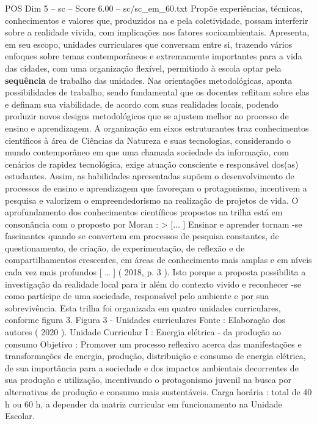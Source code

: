 \begin{textsample}{POS Dim 5 – sc – Score 6.00 – sc/sc\_em\_60.txt}
Propõe experiências, técnicas, conhecimentos e valores que, produzidos na e pela coletividade, possam interferir sobre a realidade vivida, com implicações nos fatores socioambientais.
Apresenta, em seu escopo, unidades curriculares que conversam entre si, trazendo vários enfoques sobre temas contemporâneos e extremamente importantes para a vida das cidades, com uma organização flexível, permitindo à escola optar pela \textbf{sequência} de trabalho das unidades.
Nas orientações metodológicas, aponta possibilidades de trabalho, sendo fundamental que os docentes reflitam sobre elas e definam sua viabilidade, de acordo com suas realidades locais, podendo produzir novos designs metodológicos que se ajustem melhor ao processo de ensino e aprendizagem.
A organização em eixos estruturantes traz conhecimentos científicos à área de Ciências da Natureza e suas tecnologias, considerando o mundo contemporâneo em que uma chamada sociedade da informação, com cenários de rapidez tecnológica, exige atuação consciente e responsável dos(as) estudantes.
Assim, as habilidades apresentadas supõem o desenvolvimento de processos de ensino e aprendizagem que favoreçam o protagonismo, incentivem a pesquisa e valorizem o empreendedorismo na realização de projetos de vida.
O aprofundamento dos conhecimentos científicos propostos na trilha está em consonância com o proposto por Moran : > [... ] Ensinar e aprender tornam -se fascinantes quando se convertem em processos de pesquisa constantes, de questionamento, de criação, de experimentação, de reflexão e de compartilhamentos crescentes, em áreas de conhecimento mais amplas e em níveis cada vez mais profundos [ … ] ( 2018, p. 3 ).
Isto porque a proposta possibilita a investigação da realidade local para ir além do contexto vivido e reconhecer -se como partícipe de uma sociedade, responsável pelo ambiente e por sua sobrevivência.
Esta trilha foi organizada em quatro unidades curriculares, conforme figura 3.
Figura 3 - Unidades curriculares Fonte : Elaboração dos autores ( 2020 ).
Unidade Curricular I : Energia elétrica - da produção ao consumo Objetivo : Promover um processo reflexivo acerca das manifestações e transformações de energia, produção, distribuição e consumo de energia elétrica, de sua importância para a sociedade e dos impactos ambientais decorrentes de sua produção e utilização, incentivando o protagonismo juvenil na busca por alternativas de produção e consumo mais sustentáveis.
Carga horária : total de 40 h ou 60 h, a depender da matriz curricular em funcionamento na Unidade Escolar.

\end{textsample}
